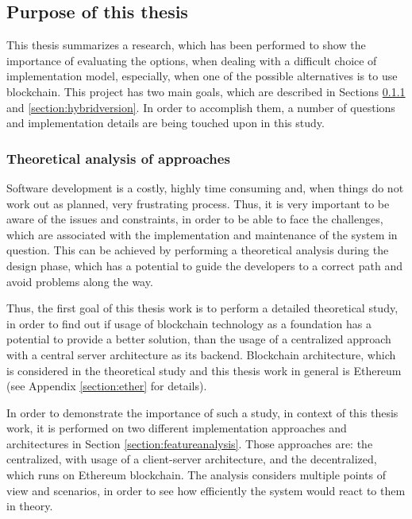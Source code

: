 \subsection{Purpose of this thesis} \label{section:purpose}
This thesis summarizes a research, which has been performed to show the importance of evaluating the options, when dealing with a difficult choice of implementation model, especially, when one of the possible alternatives is to use blockchain. This project has two main goals, which are described in Sections \ref{section:centvsdecent} and \ref{section:hybridversion}. In order to accomplish them, a number of questions and implementation details are being touched upon in this study.

\subsubsection{Theoretical analysis of approaches} \label{section:centvsdecent}
Software development is a costly, highly time consuming and, when things do not work out as planned, very frustrating process. Thus, it is very important to be aware of the issues and constraints, in order to be able to face the challenges, which are associated with the implementation and maintenance of the system in question. This can be achieved by performing a theoretical analysis during the design phase, which has a potential to guide the developers to a correct path and avoid problems along the way.

Thus, the first goal of this thesis work is to perform a detailed theoretical study, in order to find out if usage of blockchain technology as a foundation has a potential to provide a better solution, than the usage of a centralized approach with a central server architecture as its backend. Blockchain architecture, which is considered in the theoretical study and this thesis work in general is Ethereum (see Appendix \ref{section:ether} for details). 

In order to demonstrate the importance of such a study, in context of this thesis work, it is performed on two different implementation approaches and architectures in Section \ref{section:featureanalysis}. Those approaches are: the centralized, with usage of a client-server architecture, and the decentralized, which runs on Ethereum blockchain. The analysis considers multiple points of view and scenarios, in order to see how efficiently the system would react to them in theory.

